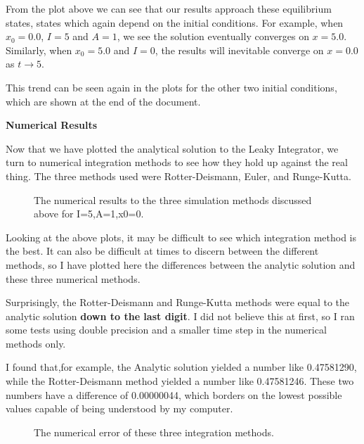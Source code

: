 \documentclass[a4paper,12pt]{article}
\begin{document}
From the plot above we can see that our results approach these equilibrium states, states which again depend on the initial conditions. For example, when $x_0=0.0$, $I=5$ and $A=1$, we see the solution eventually converges on $x=5.0$. Similarly, when $x_0=5.0$ and $I=0$, the results will inevitable converge on $x=0.0$ as $t\rightarrow5$. 

\vspace{2mm}

This trend can be seen again in the plots for the other two initial conditions, which are shown at the end of the document. 

\vfil\eject

{\bf Numerical Results}
\bigskip 

Now that we have plotted the analytical solution to the Leaky Integrator, we turn to numerical integration methods to see how they hold up against the real thing. The three methods used were Rotter-Deismann, Euler, and Runge-Kutta.

\begin{figure}[h!]
\begin{center}
\end{center}
\caption{\label{pict2} The numerical results to the three simulation methods discussed above for I=5,A=1,x0=0. }
\end{figure}

Looking at the above plots, it may be difficult to see which integration method is the best. It can also be difficult at times to discern between the different methods, so I have plotted here the differences between the analytic solution and these three numerical methods. 

\vfil\eject

Surprisingly, the Rotter-Deismann and Runge-Kutta methods were equal to the analytic solution {\bf down to the last digit}. I did not believe this at first, so I ran some tests using double precision and a smaller time step in the numerical methods only. 

I found that,for example, the Analytic solution yielded a number like 0.47581290, while the Rotter-Deismann method yielded a number like 0.47581246. These two numbers have a difference of 0.00000044, which borders on the lowest possible values capable of being understood by my computer. 

\begin{figure}[h!]
\begin{center}
\end{center}
\caption{\label{pict3} The numerical error of these three integration methods. }
\end{figure}
\end{document}
